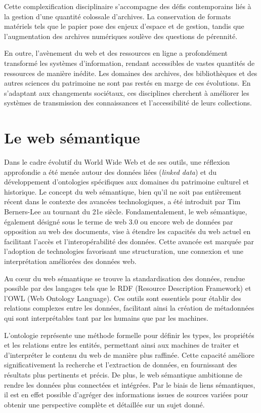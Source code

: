 \documentclass[12pt]{report}
\begin{document}
Cette complexification disciplinaire s'accompagne des défis contemporains liés à la gestion d'une quantité colossale d'archives. La conservation de formats matériels tels que le papier pose des enjeux d'espace et de gestion, tandis que l'augmentation des archives numériques soulève des questions de pérennité.

En outre, l'avènement du web et des ressources en ligne a profondément transformé les systèmes d'information, rendant accessibles de vastes quantités de ressources de manière inédite. Les domaines des archives, des bibliothèques et des autres sciences du patrimoine ne sont pas restés en marge de ces évolutions. En s'adaptant aux changements sociétaux, ces disciplines cherchent à améliorer les systèmes de transmission des connaissances et l'accessibilité de leurs collections.
\section{Le web sémantique}
Dans le cadre évolutif du World Wide Web et de ses outils, une réflexion approfondie a été menée autour des données liées (\textit{linked data}) et du développement d'ontologies spécifiques aux domaines du patrimoine culturel et historique. Le concept du web sémantique, bien qu'il ne soit pas entièrement récent dans le contexte des avancées technologiques, a été introduit par Tim Berners-Lee au tournant du 21e siècle. Fondamentalement, le web sémantique, également désigné sous le terme de web 3.0 ou encore web de données par opposition au web des documents, vise à étendre les capacités du web actuel en facilitant l'accès et l'interopérabilité des données. Cette avancée est marquée par l'adoption de technologies favorisant une structuration, une connexion et une interprétation améliorées des données web.

Au cœur du web sémantique se trouve la standardisation des données, rendue possible par des langages tels que le RDF (Resource Description Framework) et l'OWL (Web Ontology Language). Ces outils sont essentiels pour établir des relations complexes entre les données, facilitant ainsi la création de métadonnées qui sont interprétables tant par les humains que par les machines.

L'ontologie représente une méthode formelle pour définir les types, les propriétés et les relations entre les entités, permettant ainsi aux machines de traiter et d'interpréter le contenu du web de manière plus raffinée. Cette capacité améliore significativement la recherche et l'extraction de données, en fournissant des résultats plus pertinents et précis.
De plus, le web sémantique ambitionne de rendre les données plus connectées et intégrées. Par le biais de liens sémantiques, il est en effet possible d'agréger des informations issues de sources variées pour obtenir une perspective complète et détaillée sur un sujet donné.
\end{document}

